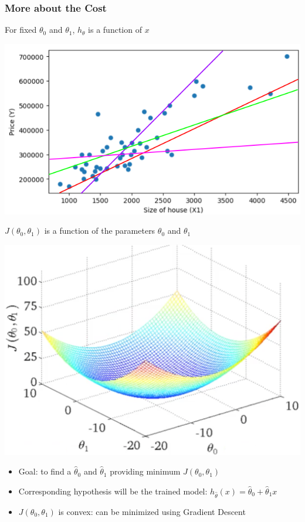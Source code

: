 \documentclass[xcolor=pdftex,dvipsnames]{beamer}
\begin{document}
\begin{frame}
  \frametitle{More about the Cost}
  \pause
  \begin{minipage}{0.47\linewidth}
    For fixed $\theta_0$ and $\theta_1$, $h_{\theta}$ is a function of $x$
    \begin{center}
      \includegraphics[scale=0.25]{./fig/house_price_linefit.png}
    \end{center}
   \end{minipage}\hfill
  \pause
  \begin{minipage}{0.47\linewidth}
    $J(\theta_0, \theta_1)$ is a function of the parameters $\theta_0$ and $\theta_1$
    \begin{center}
      \includegraphics[scale=0.25]{./fig/plot_j_theta.png}
    \end{center}
  \end{minipage}
  \pause
  \begin{itemize}
  \item Goal: to find a $\hat{\theta}_0$ and $\hat{\theta}_1$ providing minimum $J(\theta_0, \theta_1)$
  \item Corresponding hypothesis will be the trained model: $h_{\hat{\theta}}(x) = \hat{\theta}_0 + \hat{\theta}_1x$
  \item $J(\theta_0, \theta_1)$ is convex: can be minimized using \alert{Gradient Descent}
  \end{itemize}
\end{frame}
\end{document}
